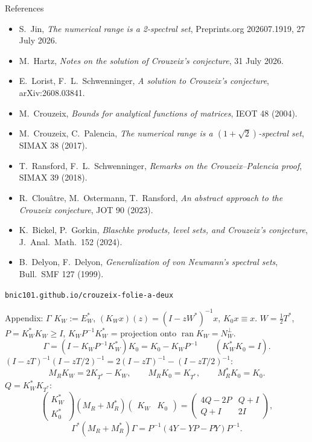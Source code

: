 \documentclass[14pt]{beamer}
\newcommand{\K}{\mathcal{K}}
\DeclareMathOperator{\ran}{ran}
\newcommand{\siteurl}{bnic101.github.io/crouzeix-folie-a-deux}
\begin{document}
\begin{frame}{References}
  \scriptsize
  \begin{itemize}
    \item S.~Jin, \emph{The numerical range is a 2-spectral set}, Preprints.org 202607.1919, 27 July 2026.
    \item M.~Hartz, \emph{Notes on the solution of Crouzeix's conjecture}, 31 July 2026.
    \item E.~Lorist, F.~L.~Schwenninger, \emph{A solution to Crouzeix's conjecture}, arXiv:2608.03841.
    \item M.~Crouzeix, \emph{Bounds for analytical functions of matrices}, IEOT 48 (2004).
    \item M.~Crouzeix, C.~Palencia, \emph{The numerical range is a $(1+\sqrt2)$-spectral set}, SIMAX 38 (2017).
    \item T.~Ransford, F.~L.~Schwenninger, \emph{Remarks on the Crouzeix--Palencia proof}, SIMAX 39 (2018).
    \item R.~Clou\^atre, M.~Ostermann, T.~Ransford, \emph{An abstract approach to the Crouzeix conjecture}, JOT 90 (2023).
    \item K.~Bickel, P.~Gorkin, \emph{Blaschke products, level sets, and Crouzeix's conjecture}, J.\ Anal.\ Math.\ 152 (2024).
    \item B.~Delyon, F.~Delyon, \emph{Generalization of von Neumann's spectral sets}, Bull.\ SMF 127 (1999).
  \end{itemize}
  \medskip
  \texttt{\siteurl}
\end{frame}
\note{}

\appendix

\begin{frame}{Appendix: $\Gamma$}
  \small
  $K_W:=E_W^*$, $(K_Wx)(z)=(I-zW^*)^{-1}x$, $K_0x\equiv x$. $W=\tfrac12T^*$, $P=K_W^*K_W\ge I$, $K_WP^{-1}K_W^*$ = projection onto $\ran K_W=N_W^\perp$.
  \[
    \Gamma=(I-K_WP^{-1}K_W^*)K_0=K_0-K_WP^{-1}\qquad(K_W^*K_0=I).
  \]
  $(I-zT)^{-1}(I-zT/2)^{-1}=2(I-zT)^{-1}-(I-zT/2)^{-1}$:
  \[
    M_RK_W=2K_{T^*}-K_W,\qquad M_RK_0=K_{T^*},\qquad M_R^*K_0=K_0 .
  \]
  $Q=K_W^*K_{T^*}$:
  \[
    \begin{pmatrix}K_W^*\\K_0^*\end{pmatrix}(M_R+M_R^*)\begin{pmatrix}K_W&K_0\end{pmatrix}
    =\begin{pmatrix}4Q-2P&Q+I\\Q+I&2I\end{pmatrix},
  \]
  \[
    \Gamma^*(M_R+M_R^*)\Gamma=P^{-1}(4Y-YP-PY)P^{-1}.
  \]
\end{frame}
\end{document}
